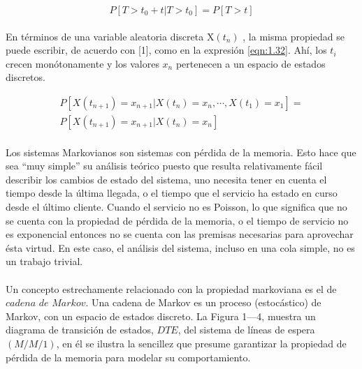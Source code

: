 \begin{equation}
    P\left [ T>t_{0}+t|T>t_{0} \right ]=P\left [ T>t \right ]
    \label{eqn:1.31}
\end{equation}
\\
En términos de una variable aleatoria discreta X$\left ( t_{n} \right )$ , la misma propiedad se puede escribir, de acuerdo con [1], como en la expresión \ref{eqn:1.32}. Ahí, los  $t_{i}$ crecen monótonamente y los valores $x_{n}$ pertenecen a un espacio de estados discretos.

\begin{eqnarray}
   P\left [ X\left ( t_{n+1} \right )=x_{n+1}|X\left ( t_{n} \right )=x_{n},\cdots ,X\left ( t_{1} \right )=x_{1} \right ]= \nonumber \\
   P\left [ X\left ( t_{n+1} \right )=x_{n+1}|X\left ( t_{n} \right )=x_{n} \right ]
    \label{eqn:1.32}
\end{eqnarray}
\\
Los sistemas Markovianos son sistemas con pérdida de la memoria. Esto hace que sea “muy simple” su análisis teórico puesto que resulta relativamente fácil describir los cambios de estado del sistema, uno necesita tener en cuenta el tiempo desde la última llegada, o el tiempo que el servicio
ha estado en curso desde el último cliente. Cuando el servicio no es Poisson, lo que significa que no se cuenta con la propiedad de pérdida de la memoria, o el tiempo de servicio no es exponencial entonces no se cuenta con las premisas necesarias para aprovechar ésta virtud. En este caso, el análisis del sistema, incluso en una cola simple, no es un trabajo trivial.
\\\\
Un concepto estrechamente relacionado con la propiedad markoviana es el de $cadena$ $de$ $Markov$. Una cadena de Markov es un proceso (estocástico) de Markov, con un espacio de estados discreto. La Figura 1—4, muestra un diagrama de transición de estados, $DTE$, del sistema de líneas de espera
$(M/M/1)$, en él se ilustra la sencillez que presume garantizar la propiedad de pérdida de la memoria para modelar su comportamiento.



